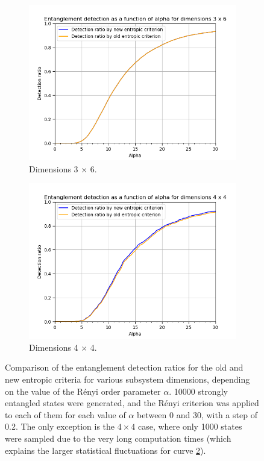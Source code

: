 \begin{figure}[ht]
\begin{subfigure}[b]{0.5\linewidth}
    \centering
    \includegraphics[width=0.95\linewidth]{images/renyi_comparison_3_6_30_0.2.png} 
    \caption{Dimensions 3 $\times$ 6.} 
    \label{fig:renyi_3x6} 
  \end{subfigure}%
  \begin{subfigure}[b]{0.5\linewidth}
    \centering
    \includegraphics[width=0.95\linewidth]{images/renyi_comparison_4_4_30_0.2.png} 
    \caption{Dimensions 4 $\times$ 4.} 
    \label{fig:renyi_4x4} 
  \end{subfigure} 
  \caption{Comparison of the entanglement detection ratios for the old and new entropic criteria for various subsystem dimensions, depending on the value of the R\'enyi order parameter $\alpha$. 10000 strongly entangled states were generated, and the R\'enyi criterion was applied to each of them for each value of $\alpha$ between 0 and 30, with a step of 0.2. The only exception is the $4 \times 4$ case, where only 1000 states were sampled due to the very long computation times (which explains the larger statistical fluctuations for curve \ref{fig:renyi_4x4}).}
  \label{fig:renyi_comparison} 
\end{figure}

